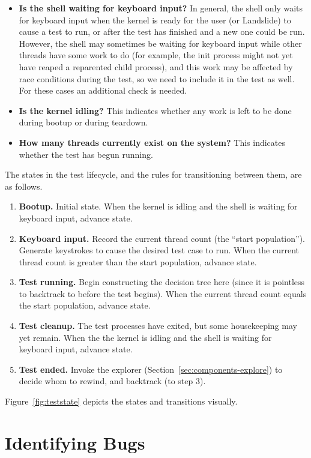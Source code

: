 \begin{itemize}
	\item {\bf Is the shell waiting for keyboard input?} In general, the shell only waits for keyboard input when the kernel is ready for the user (or Landslide) to cause a test to run, or after the test has finished and a new one could be run.
		However, the shell may sometimes be waiting for keyboard input while other threads have some work to do (for example, the init process might not yet have reaped a reparented child process), and this work may be affected by race conditions during the test, so we need to include it in the test as well. For these cases an additional check is needed.
	\item {\bf Is the kernel idling?} This indicates whether any work is left to be done during bootup or during teardown.
	\item {\bf How many threads currently exist on the system?} This indicates whether the test has begun running.
\end{itemize}

The states in the test lifecycle, and the rules for transitioning between them, are as follows.

\begin{enumerate}
	\item {\bf Bootup.} Initial state. When the kernel is idling and the shell is waiting for keyboard input, advance state.
	\item {\bf Keyboard input.} Record the current thread count (the ``start population''). Generate keystrokes to cause the desired test case to run.
		When the current thread count is greater than the start population, advance state.
	\item {\bf Test running.} Begin constructing the decision tree here (since it is pointless to backtrack to before the test begins). When the current thread count equals the start population, advance state.
	\item {\bf Test cleanup.} The test processes have exited, but some housekeeping may yet remain. When the the kernel is idling and the shell is waiting for keyboard input, advance state.
	\item {\bf Test ended.} Invoke the explorer (Section~\ref{sec:components-explore}) to decide whom to rewind, and backtrack (to step 3).
\end{enumerate}

Figure~\ref{fig:teststate} depicts the states and transitions visually.

\section{Identifying Bugs}
\label{sec:techniques-bugs}

